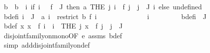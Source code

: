 \begin{isabellebody}
\ b\ \ {\isachardoublequoteopen}b\ {\isacharequal}{\kern0pt}\ {\isacharparenleft}{\kern0pt}{\isasymlambda}i{\isachardot}{\kern0pt}\ if\ i\ {\isasymin}\ {\isacharparenleft}{\kern0pt}{\isasymUnion}\ {\isacharparenleft}{\kern0pt}f\ {\isacharbackquote}{\kern0pt}\ J{\isacharprime}{\kern0pt}{\isacharparenright}{\kern0pt}{\isacharparenright}{\kern0pt}\ then\ a\ {\isacharparenleft}{\kern0pt}THE\ j{\isachardot}{\kern0pt}\ i\ {\isasymin}\ f\ j\ {\isasymand}\ j\ {\isasymin}\ J{\isacharprime}{\kern0pt}{\isacharparenright}{\kern0pt}\ i\ else\ undefined{\isacharparenright}{\kern0pt}{\isachardoublequoteclose}\ \isanewline
\ \ \ \ \isamarkupfalse%
\ b{\isacharunderscore}{\kern0pt}def{\isacharcolon}{\kern0pt}{\isachardoublequoteopen}{\isasymAnd}i{\isachardot}{\kern0pt}\ i\ {\isasymin}\ J{\isacharprime}{\kern0pt}\ {\isasymLongrightarrow}\ a\ i\ {\isacharequal}{\kern0pt}\ restrict\ b\ {\isacharparenleft}{\kern0pt}f\ i{\isacharparenright}{\kern0pt}{\isachardoublequoteclose}\isanewline
\ \ \ \ \isamarkupfalse%
\ {\isacharminus}{\kern0pt}\isanewline
\ \ \ \ \ \ \isamarkupfalse%
\ i\ \isanewline
\ \ \ \ \ \ \isamarkupfalse%
\ b{\isacharunderscore}{\kern0pt}def{\isacharunderscore}{\kern0pt}{}{\isacharcolon}{\kern0pt}{\isachardoublequoteopen}i\ {\isasymin}\ J{\isacharprime}{\kern0pt}{\isachardoublequoteclose}\isanewline
\ \ \ \ \ \ \isamarkupfalse%
\ b{\isacharunderscore}{\kern0pt}def{\isacharunderscore}{\kern0pt}{}{\isacharcolon}{\kern0pt}\ {\isachardoublequoteopen}{\isasymAnd}x{\isachardot}{\kern0pt}\ x\ {\isasymin}\ f\ i\ {\isasymLongrightarrow}\ i\ {\isacharequal}{\kern0pt}\ {\isacharparenleft}{\kern0pt}THE\ j{\isachardot}{\kern0pt}\ x\ {\isasymin}\ f\ j\ {\isasymand}\ j\ {\isasymin}\ J{\isacharprime}{\kern0pt}{\isacharparenright}{\kern0pt}{\isachardoublequoteclose}\isanewline
\ \ \ \ \ \ \ \ \isamarkupfalse%
\ disjoint{\isacharunderscore}{\kern0pt}family{\isacharunderscore}{\kern0pt}on{\isacharunderscore}{\kern0pt}mono{\isacharbrackleft}{\kern0pt}OF\ e\ assms{\isacharparenleft}{\kern0pt}{}{\isacharparenright}{\kern0pt}{\isacharbrackright}{\kern0pt}\ b{\isacharunderscore}{\kern0pt}def{\isacharunderscore}{\kern0pt}{}\ \isanewline
\ \ \ \ \ \ \ \ \isamarkupfalse%
\ {\isacharparenleft}{\kern0pt}simp\ add{\isacharcolon}{\kern0pt}disjoint{\isacharunderscore}{\kern0pt}family{\isacharunderscore}{\kern0pt}on{\isacharunderscore}{\kern0pt}def{\isacharparenright}{\kern0pt}\ \isanewline
\ \ \ \ \ \ \ \ \isamarkupfalse%

\end{isabellebody}
